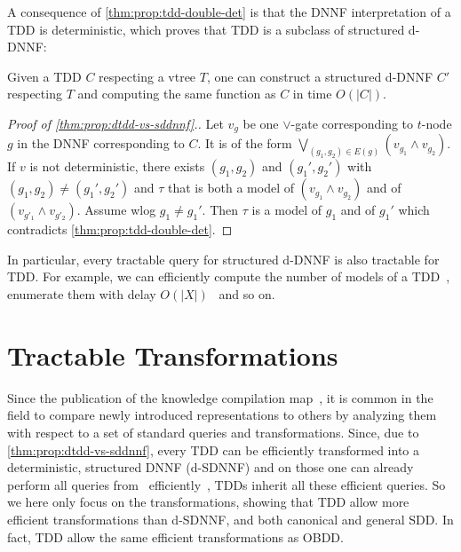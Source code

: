 \documentclass[a4paper,UKenglish,cleveref, autoref, thm-restate]{lipics-v2021}
\newcommand{\istefan}[1]{\todo[inline,color=pink]{Stefan: #1}}
\newcommand{\iflorent}[1]{\todo[inline,color=green]{Florent: #1}}
\begin{document}
A consequence of \cref{thm:prop:tdd-double-det} is that the DNNF interpretation of a TDD is deterministic, which proves that TDD is a subclass of structured d-DNNF:
%
\begin{theorem}[$\star$]
    \label{thm:prop:dtdd-vs-sddnnf} Given a TDD $C$ respecting a vtree $T$, one can construct a structured d-DNNF $C'$ respecting $T$ and computing the same function as $C$ in time $O(|C|)$. 
  \end{theorem}
  \begin{toappendix}
  \begin{proof}[Proof of \cref{thm:prop:dtdd-vs-sddnnf}.]
    Let $v_g$ be one $\vee$-gate corresponding to $t$-node $g$ in the DNNF corresponding to $C$. It is of the form $\bigvee_{(g_1,g_2) \in E(g)} (v_{g_1} \wedge v_{g_2})$. If $v$ is not deterministic, there exists $(g_1,g_2)$ and $(g_1',g_2')$ with $(g_1,g_2) \neq (g_1',g_2')$ and $\tau$ that is both a model of $(v_{g_1} \wedge v_{g_2})$ and of $(v_{g'_1} \wedge v_{g'_2})$. Assume wlog $g_1 \neq g_1'$. Then $\tau$ is a model of $g_1$ and of $g_1'$ which contradicts \cref{thm:prop:tdd-double-det}. 
  \end{proof}
\end{toappendix}

In particular, every tractable query for structured d-DNNF is also tractable for TDD. For example, we can efficiently compute the number of models of a TDD~\cite{DarwicheM2002}, enumerate them with delay $O(|X|)$~\cite{AmarilliBJM17} and so on. 

\section{Tractable Transformations}
\label{sec:transformations}

Since the publication of the knowledge compilation map~\cite{DarwicheM2002}, it is common in the field to compare newly introduced representations to others by analyzing them with respect to a set of standard queries and transformations. Since, due to \cref{thm:prop:dtdd-vs-sddnnf}, every TDD can be efficiently transformed into a deterministic, structured DNNF (d-SDNNF) and on those one can already perform all queries from~\cite{DarwicheM2002} efficiently~\cite{PipatsrisawatD08}, TDDs inherit all these efficient queries. So we here only focus on the transformations, showing that TDD allow more efficient transformations than d-SDNNF, and both canonical and general SDD. In fact, TDD allow the same efficient transformations as OBDD.
\end{document}
